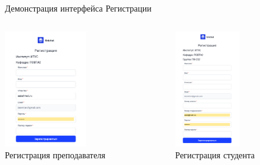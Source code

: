 \documentclass[aspectratio=169]{beamer}
\begin{document}
\begin{frame}{Демонстрация интерфейса Регистрации}
\begin{columns}
    \begin{column}{0.45\textwidth}
        \centering
        \includegraphics[height=5cm]{static/RegTeacherPage.png} \\
        \small Регистрация преподавателя
    \end{column}
    \begin{column}{0.45\textwidth}
        \centering
        \includegraphics[height=5cm]{static/RegStudentPage.png} \\
        \small Регистрация студента
    \end{column}
\end{columns}
\end{frame}
\end{document}
